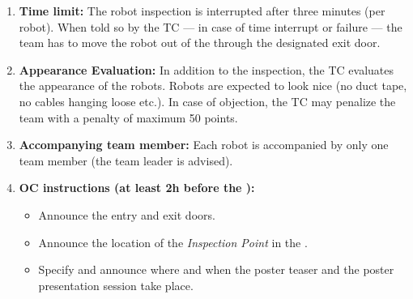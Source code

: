 \begin{enumerate}
	\item \textbf{Time limit:} The robot inspection is interrupted after three minutes (per robot). When told so by the TC --- in case of time interrupt or failure --- the team has to move the robot out of the \Arena{} through the designated exit door.
	\item \textbf{Appearance Evaluation:} In addition to the inspection, the TC evaluates the appearance of the robots. Robots are expected to look nice (no duct tape, no cables hanging loose etc.). In case of objection, the TC may penalize the team with a penalty of maximum 50 points.
	\item \textbf{Accompanying team member:} Each robot is accompanied by only one team member (the team leader is advised).
	\item \textbf{OC instructions (at least 2h before the \RobotInspection):}
	\begin{itemize}
		\item Announce the entry and exit doors.
		\item Announce the location of the \textit{Inspection Point} in the \Arena{}.
		\item Specify and announce where and when the poster teaser and the poster presentation session take place.
	\end{itemize}
\end{enumerate}


